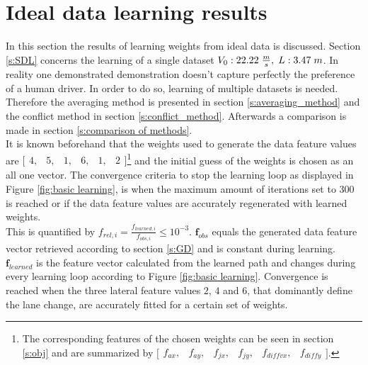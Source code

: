 \section{Ideal data learning results} \label{s:ID_results}
In this section the results of learning weights from ideal data is discussed.
Section \ref{s:SDL} concerns the learning of a single dataset $V_0:22.22\hspace{1mm}\frac{m}{s},\hspace{1mm} L:3.47\hspace{1mm}m$. In reality one demonstrated demonstration doesn't capture perfectly the preference of a human driver. In order to do so, learning of multiple datasets is needed. Therefore the averaging method is presented in section \ref{s:averaging_method} and the conflict method in section \ref{s:conflict_method}. Afterwards a comparison is made in section \ref{s:comparison of methods}.\\

It is known beforehand that the weights used to generate the data feature values are  $\bigl[ \begin{smallmatrix} 4,&5,&1,&6,&1,&2\end{smallmatrix}\bigr]$\footnote{The corresponding features  of the chosen weights can be seen in section \ref{s:obj} and are summarized by $\bigl[ \begin{smallmatrix} f_{ax},&f_{ay},&f_{jx},&f_{jy},&f_{diff vx},&f_{diff y}\end{smallmatrix}\bigr]$.} and the initial guess of the weights is chosen as an all one vector. The convergence criteria to stop the learning loop as displayed in Figure \ref{fig:basic learning}, is when the maximum amount of iterations set to $300$ is reached or if the data feature values are accurately regenerated with learned weights.\\
This is quantified by $f_{rel,i} = \frac{f_{learned,i}}{f_{obs,i}} \leq 10^{-3}$.  $\bm{f}_{obs}$ equals the generated data feature vector retrieved according to section \ref{s:GD} and is constant during learning. $\bm{f}_{learned}$ is the feature vector calculated from the learned path and changes during every learning loop according to Figure \ref{fig:basic learning}. Convergence is reached when the three lateral feature values $2$, $4$ and $6$, that dominantly define the lane change, are accurately fitted for a certain set of weights.\\
		
